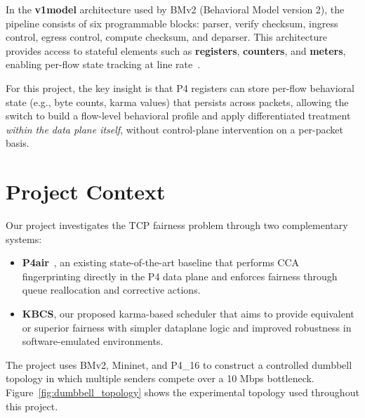 \documentclass[12pt,a4paper]{report}
\begin{document}
In the \textbf{v1model} architecture used by BMv2 (Behavioral Model version 2), the pipeline consists of six programmable blocks: parser, verify checksum, ingress control, egress control, compute checksum, and deparser. This architecture provides access to stateful elements such as \textbf{registers}, \textbf{counters}, and \textbf{meters}, enabling per-flow state tracking at line rate~\cite{p4cci, p5}.

For this project, the key insight is that P4 registers can store per-flow behavioral state (e.g., byte counts, karma values) that persists across packets, allowing the switch to build a flow-level behavioral profile and apply differentiated treatment \textit{within the data plane itself}, without control-plane intervention on a per-packet basis.

\section{Project Context}
Our project investigates the TCP fairness problem through two complementary systems:
\begin{itemize}
    \item \textbf{P4air}~\cite{p4air}, an existing state-of-the-art baseline that performs CCA fingerprinting directly in the P4 data plane and enforces fairness through queue reallocation and corrective actions.
    \item \textbf{KBCS}, our proposed karma-based scheduler that aims to provide equivalent or superior fairness with simpler dataplane logic and improved robustness in software-emulated environments.
\end{itemize}

The project uses BMv2, Mininet, and P4\_16 to construct a controlled dumbbell topology in which multiple senders compete over a 10 Mbps bottleneck. Figure~\ref{fig:dumbbell_topology} shows the experimental topology used throughout this project.
\end{document}
